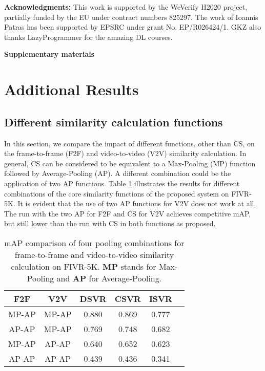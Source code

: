 \documentclass[10pt,twocolumn,letterpaper]{article}
\begin{document}
\bigskip\noindent\textbf{Acknowledgments:}
This work is supported by the WeVerify H2020 project, partially funded by the EU under contract numbers 825297. The work of Ioannis Patras has been supported by EPSRC under grant No. EP/R026424/1. GKZ also thanks LazyProgrammer for the amazing DL courses.

{\small
\balance


}

\newpage


\begin{center}
\Large \textbf{Supplementary materials}
\vspace{1cm}
\end{center}


\renewcommand\thesection{\Alph{section}}


\setcounter{section}{0}

\section{Additional Results}

\subsection{Different similarity calculation functions}

In this section, we compare the impact of different functions, other than CS, on the frame-to-frame (F2F) and video-to-video (V2V) similarity calculation. In general, CS can be considered to be equivalent to a Max-Pooling (MP) function followed by Average-Pooling (AP). A different combination could be the application of two AP functions. Table \ref{tab:diff_pooling} illustrates the results for different combinations of the core similarity functions of the proposed system on FIVR-5K. It is evident that the use of two AP functions for V2V does not work at all. The run with the two AP for F2F and CS for V2V achieves competitive mAP, but still lower than the run with CS in both functions as proposed.

\begin{table}[h]
  \centering
  \begin{tabular}{|c|c|c|c|c|c|}
    \hline
      \textbf{F2F} & \textbf{V2V} &   \textbf{DSVR}   &   \textbf{CSVR}   &   \textbf{ISVR}     \\ \hline\hline
      MP-AP & MP-AP & 0.880   &  0.869   &  0.777  \\ \hline
      AP-AP & MP-AP & 0.769   &  0.748   &  0.682  \\ \hline
      MP-AP & AP-AP & 0.640   &  0.652   &  0.623  \\ \hline
      AP-AP & AP-AP & 0.439   &  0.436   &  0.341  \\ \hline
    \end{tabular}
  \caption{mAP comparison of four pooling combinations for frame-to-frame and video-to-video similarity calculation on FIVR-5K. \textbf{MP} stands for Max-Pooling and \textbf{AP} for Average-Pooling.}
  \label{tab:diff_pooling}
\end{table}
\end{document}
